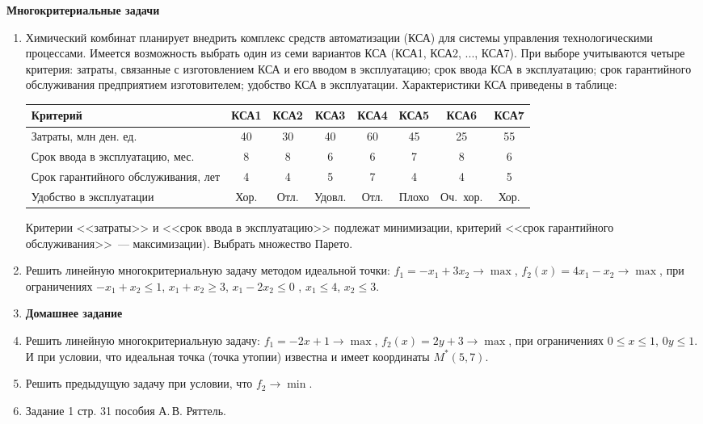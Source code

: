 \documentclass[a4paper,14pt]{extarticle}
\begin{document}
{
\bfseries Многокритериальные задачи
\par\vspace{1mm}
}
\begin{enumerate}
    \item 
    Химический комбинат планирует внедрить комплекс средств автоматизации (КСА) для системы управления технологическими процессами. Имеется возможность выбрать один из семи вариантов КСА (КСА1, КСА2, ..., КСА7). При выборе учитываются четыре критерия: затраты, связанные с изготовлением КСА и его вводом в эксплуатацию; срок ввода КСА в эксплуатацию; срок гарантийного обслуживания предприятием изготовителем; удобство КСА в эксплуатации. Характеристики КСА приведены в таблице:

    {\centering \small
    \begin{tabular}{|p{6cm}|c|c|c|c|c|c|c|}
        \hline
        Критерий & КСА1 & КСА2 & КСА3 & КСА4 & КСА5 & КСА6 & КСА7\\
        \hline
        Затраты, млн ден. ед. &
        40 &  30 & 40 & 60 & 45 & 25 & 55 \\
        \hline
        Срок ввода в эксплуатацию, мес. & 
        8 & 8 & 6 & 6 & 7 & 8 & 6 \\
        \hline
        Срок гарантийного обслуживания, лет &
        4 & 4 & 5 & 7 & 4 & 4 & 5 \\
        \hline
        Удобство в эксплуатации &
        Хор. & Отл.  & Удовл.  & Отл.  & Плохо  & Оч.~хор.  & Хор. \\
        \hline
    \end{tabular}
    \par}

    Критерии <<затраты>> и <<срок ввода в эксплуатацию>> подлежат минимизации, 
    критерий <<срок гарантийного обслуживания>>~--- максимизации). 
    Выбрать множество Парето.


    \item  Решить линейную многокритериальную задачу методом идеальной точки:
        $f_1=-x_1+3x_2 \to \max$, $f_2(x)=4x_1-x_2 \to \max$, при ограничениях
        $-x_1+x_2 \leqslant 1$, $x_1+x_2 \geqslant 3$, $x_1-2x_2 \leqslant 0$ , $x_1 \leqslant 4$, $x_2 \leqslant 3$. 
    
    \item[] \textbf{Домашнее задание}
   \item 
    Решить линейную многокритериальную задачу:
   $f_1=-2x+1 \to \max$, $f_2(x)=2y+3 \to \max$, при ограничениях
   $0 \leqslant x \leqslant 1$, $ 0 y \leqslant 1$.  И при условии, что идеальная точка (точка утопии) известна и имеет координаты $M^*(5,7)$.
   \item 
    Решить предыдущую задачу при условии, что $f_2 \to \min$.
   \item Задание 1 стр. 31 пособия А.\,В. Ряттель.
\end{enumerate}
\end{document}
